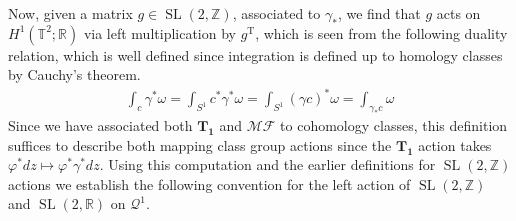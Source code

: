 \documentclass{article}
\newcommand{\slr}{\operatorname{SL}(2,\mathbb{R})}
\newcommand{\slz}{\operatorname{SL}(2,\mathbb{Z})}
\begin{document}
        Now, given a matrix \(g \in \slz\), associated to \(\gamma_*\), we find that \(g\) acts on \(H^1(\mathbb{T}^2;\mathbb{R})\) via left multiplication by \(g^{\operatorname{T}}\), which is seen from the following duality relation, which is well defined since integration is defined up to homology classes by Cauchy's theorem.
        \begin{align*}
            \int_c \gamma^*\omega = \int_{S^1} c^*\gamma^*\omega = \int_{S^1} (\gamma c)^*\omega = \int_{\gamma_* c} \omega
        \end{align*}
        Since we have associated both \(\mathbf{T_1}\) and \(\mathscr{MF}\) to cohomology classes, this definition suffices to describe both mapping class group actions since the \(\mathbf{T_1}\) action takes \(\varphi^*dz \mapsto \varphi^*\gamma^*dz\). Using this computation and the earlier definitions for \(\slz\) actions we establish the following convention for the left action of \(\slz\) and \(\slr\) on \(\mathcal{Q}^1\).
\end{document}
